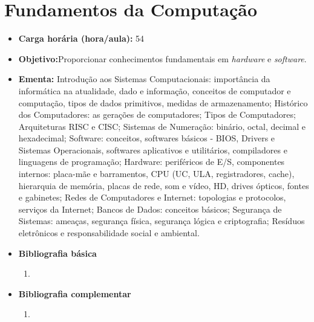 \documentclass[11pt,fleqn]{book} %
\begin{document}
\section{Fundamentos da Computação}\label{1_fundcomp}
\begin{itemize}
	\item \textbf{Carga horária (hora/aula):} 54
	\item \textbf{Objetivo:}Proporcionar conhecimentos fundamentais em \textit{hardware} e \textit{software}.
	\item \textbf{Ementa:} 
	Introdução aos Sistemas Computacionais: importância da informática na atualidade, dado e informação, conceitos de computador e computação, tipos de dados primitivos, medidas de armazenamento; 
	Histórico dos Computadores: as gerações de computadores; 
	Tipos de Computadores; Arquiteturas RISC e CISC; 
	Sistemas de Numeração: binário, octal, decimal e hexadecimal; 
	Software: conceitos, softwares básicos - BIOS, Drivers e Sistemas Operacionais, softwares aplicativos e utilitários, compiladores e linguagens de programação;
	Hardware: periféricos de E/S, componentes internos: placa-mãe e barramentos, CPU (UC, ULA, registradores, cache), hierarquia de memória, placas de rede, som e vídeo, HD, drives ópticos, fontes e gabinetes;  
	Redes de Computadores e Internet: topologias e protocolos, serviços da Internet; Bancos de Dados: conceitos básicos; Segurança de Sistemas: ameaças, segurança física, segurança lógica e criptografia;
	Resíduos eletrônicos e responsabilidade social e ambiental.
	\item \textbf{Bibliografia básica}
	\begin{enumerate}
		\item 
	\end{enumerate}
	\item \textbf{Bibliografia complementar}
	\begin{enumerate}
		\item 
	\end{enumerate}	
\end{itemize}
\end{document}
